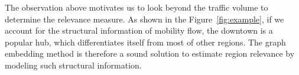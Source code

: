 The observation above motivates us to look beyond the traffic volume to determine the relevance measure. As shown in the Figure~\ref{fig:example}, if we account for the structural information of mobility flow, the downtown is a popular hub, which differentiates itself from most of other regions. The graph embedding method is therefore a sound solution to estimate region relevance by modeling such structural information.

